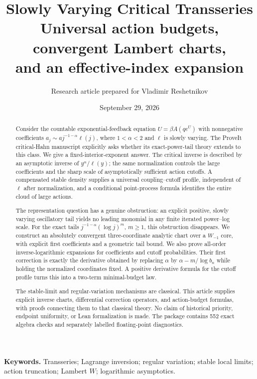 \documentclass[11pt,a4paper]{article}
\title{\vspace{-12mm}\textbf{Slowly Varying Critical Transseries}\\[4mm]
\Large Universal action budgets, convergent Lambert charts,\\
and an effective-index expansion}
\author{Research article prepared for Vladimir Reshetnikov}
\date{September 29, 2026}
\numberwithin{equation}{section}
\theoremstyle{definition}\newtheorem{definition}[theorem]{Definition}
\theoremstyle{remark}\newtheorem{remark}[theorem]{Remark}
\theoremstyle{definition}
\begin{document}
\maketitle
\begin{abstract}
Consider the countable exponential-feedback equation
$U=\beta A(qe^U)$ with nonnegative coefficients
$a_j\sim a j^{-1-\alpha}\ell(j)$, where $1<\alpha<2$ and $\ell$ is slowly
varying. The ProveIt critical-Hahn manuscript explicitly asks whether its
exact-power-tail theory extends to this class. We give a fixed-interior-exponent
answer. The critical inverse is described by an asymptotic inverse of
$y^\alpha/\ell(y)$; the same normalization controls the large coefficients
and the sharp scale of asymptotically sufficient action cutoffs. A compensated
stable density supplies a universal coupling--cutoff profile, independent
of $\ell$ after normalization, and a conditional point-process formula
identifies the entire cloud of large actions.

The representation question has a genuine obstruction: an explicit positive,
slowly varying oscillatory tail yields no leading monomial in any finite
iterated power--log scale. For the exact tails
$j^{-1-\alpha}(\log j)^m$, $m\ge1$, this obstruction disappears. We construct
an absolutely convergent three-coordinate analytic chart over a
$W_{-1}$ core, with explicit first coefficients and a geometric tail bound.
We also prove all-order inverse-logarithmic expansions for coefficients
and cutoff probabilities. Their first correction is exactly the derivative
obtained by replacing $\alpha$ by $\alpha-m/\log b_n$ while holding the
normalized coordinates fixed. A positive derivative formula for the cutoff
profile turns this into a two-term minimal-budget law.

The stable-limit and regular-variation mechanisms are classical. This article supplies explicit inverse charts, differential correction
operators, and action-budget formulas, with proofs connecting them to that
classical theory. No
claim of historical priority, endpoint uniformity, or Lean formalization
is made. The package contains 552 exact algebra checks and separately
labelled floating-point diagnostics.
\end{abstract}
\vspace{2mm}
\noindent\textbf{Keywords.} Transseries; Lagrange inversion; regular variation;
stable local limits; action truncation; Lambert $W$; logarithmic asymptotics.
\clearpage
{\small\setlength{\parskip}{0pt}\tableofcontents}
\newpage
\end{document}
